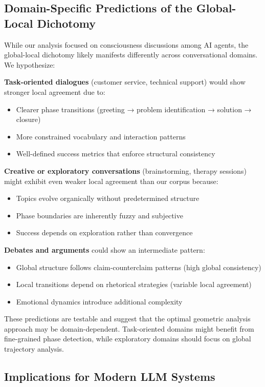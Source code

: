 \documentclass[11pt,letterpaper]{article}
\begin{document}
\subsection{Domain-Specific Predictions of the Global-Local Dichotomy}

While our analysis focused on consciousness discussions among AI agents, the global-local dichotomy likely manifests differently across conversational domains. We hypothesize:

\textbf{Task-oriented dialogues} (customer service, technical support) would show stronger local agreement due to:
\begin{itemize}
\item Clearer phase transitions (greeting → problem identification → solution → closure)
\item More constrained vocabulary and interaction patterns
\item Well-defined success metrics that enforce structural consistency
\end{itemize}

\textbf{Creative or exploratory conversations} (brainstorming, therapy sessions) might exhibit even weaker local agreement than our corpus because:
\begin{itemize}
\item Topics evolve organically without predetermined structure
\item Phase boundaries are inherently fuzzy and subjective
\item Success depends on exploration rather than convergence
\end{itemize}

\textbf{Debates and arguments} could show an intermediate pattern:
\begin{itemize}
\item Global structure follows claim-counterclaim patterns (high global consistency)
\item Local transitions depend on rhetorical strategies (variable local agreement)
\item Emotional dynamics introduce additional complexity
\end{itemize}

These predictions are testable and suggest that the optimal geometric analysis approach may be domain-dependent. Task-oriented domains might benefit from fine-grained phase detection, while exploratory domains should focus on global trajectory analysis.

\subsection{Implications for Modern LLM Systems}
\end{document}
